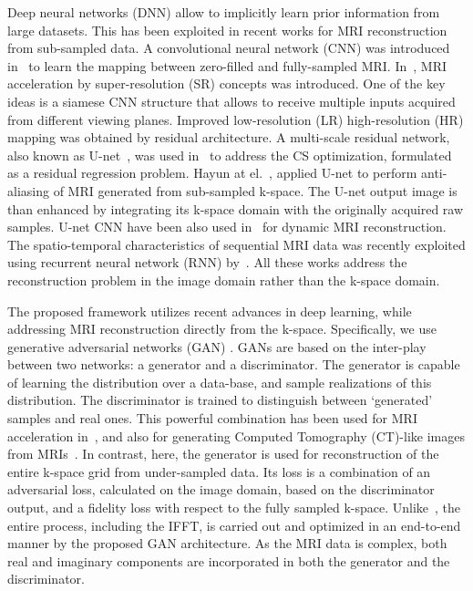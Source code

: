\documentclass[review]{elsarticle}
\begin{document}
Deep neural networks (DNN) allow to implicitly learn prior information from large datasets. This has been exploited in recent works for MRI reconstruction from sub-sampled data. A convolutional neural network (CNN) was introduced in~\cite{wang2016accelerating} to learn the mapping between zero-filled and fully-sampled MRI.
In~\cite{Oktay2016}, MRI acceleration by super-resolution (SR) concepts was introduced. One of the key ideas is a siamese CNN structure that allows to receive multiple inputs acquired from different viewing planes. Improved low-resolution (LR) high-resolution (HR) mapping was obtained by residual architecture.
A multi-scale residual network, also known as U-net~\cite{ronneberger2015u}, was used in~\cite{lee2017deep} to address the CS optimization, formulated as a residual regression problem.
Hayun at el.~\cite{hyun2017deep}, applied U-net to perform anti-aliasing of MRI generated from sub-sampled k-space. The U-net output image is than enhanced by integrating its k-space domain with the originally acquired raw samples. U-net CNN have been also used in~\cite{sandinodeep} for dynamic MRI reconstruction.
The spatio-temporal characteristics of sequential MRI data was recently exploited using recurrent neural network (RNN) by~\cite{qin2017convolutional}. All these works address the reconstruction problem in the image domain rather than the k-space domain.

The proposed framework utilizes recent advances in deep learning, while addressing MRI reconstruction directly from the k-space. Specifically, we use generative adversarial networks (GAN) \cite{goodfellow2014generative,radford2015unsupervised,pathak2016context}.
GANs are based on the inter-play between two networks: a generator and a discriminator. The generator is capable of learning the distribution over a data-base, and sample realizations of this distribution. 
The discriminator is trained to distinguish between `generated' samples and real ones. This powerful combination has been used for MRI acceleration in~\cite{yu2017deep,mardani2017deep}, and also for generating Computed Tomography (CT)-like images from MRIs~\cite{nie2016medical}.
In contrast, here, the generator is used for reconstruction of the entire k-space grid from under-sampled data. Its loss is a combination of an adversarial loss, calculated on the image domain, based on the discriminator output, and a fidelity loss with respect to the fully sampled k-space. Unlike~\cite{hyun2017deep}, the entire process, including the IFFT, is carried out and optimized in an end-to-end manner by the proposed GAN architecture. As the MRI data is complex, both real and imaginary components are incorporated in both the generator and the discriminator. 
\end{document}
